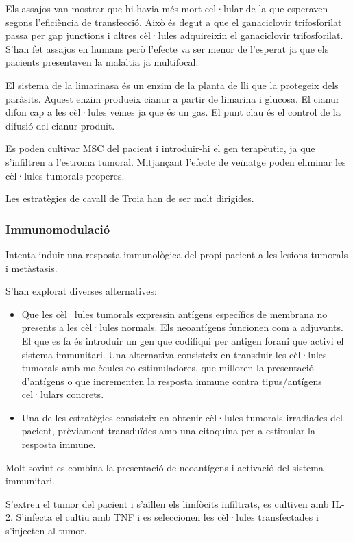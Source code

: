 Els assajos van mostrar que hi havia més mort cel·lular de la que
esperaven segons l'eficiència de transfecció. Això és degut a que el
ganaciclovir trifosforilat passa per gap junctions i altres cèl·lules
adquireixin el ganaciclovir trifosforilat. S'han fet assajos en humans
però l'efecte va ser menor de l'esperat ja que els pacients
presentaven la malaltia ja multifocal.

El sistema de la limarinasa és un enzim de la planta de lli que la
protegeix dels paràsits. Aquest enzim produeix cianur a partir de
limarina i glucosa. El cianur difon cap a les cèl·lules veïnes ja que
és un gas. El punt clau és el control de la difusió del cianur
produït.

Es poden cultivar MSC del pacient i introduir-hi el gen terapèutic, ja
que s'infiltren a l'estroma tumoral. Mitjançant l'efecte de veïnatge
poden eliminar les cèl·lules tumorals properes.

Les estratègies de cavall de Troia han de ser molt dirigides.

\subsubsection{Immunomodulació}
\label{sec:immunomodulacio}
Intenta induir una resposta immunològica del propi pacient a les
lesions tumorals i metàstasis.

S'han explorat diverses alternatives:
\begin{itemize}
\item Que les cèl·lules tumorals expressin antígens específics de
  membrana no presents a les cèl·lules normals. Els neoantígens
  funcionen com a adjuvants. El que es fa és introduir un gen que
  codifiqui per antigen forani que activi el sistema immunitari. Una
  alternativa consisteix en transduir les cèl·lules tumorals amb
  molècules co-estimuladores, que milloren la presentació d'antígens
  o que incrementen la resposta immune contra tipus/antígens
  cel·lulars concrets.

\item Una de les estratègies consisteix en obtenir cèl·lules tumorals
  irradiades del pacient, prèviament transduïdes amb una citoquina
  per a estimular la resposta immune.
\end{itemize}

Molt sovint es combina la presentació de neoantígens i activació del
sistema immunitari.

S'extreu el tumor del pacient i s'aïllen els limfòcits infiltrats, es
cultiven amb IL-2. S'infecta el cultiu amb TNF i es seleccionen les
cèl·lules transfectades i s'injecten al tumor.

